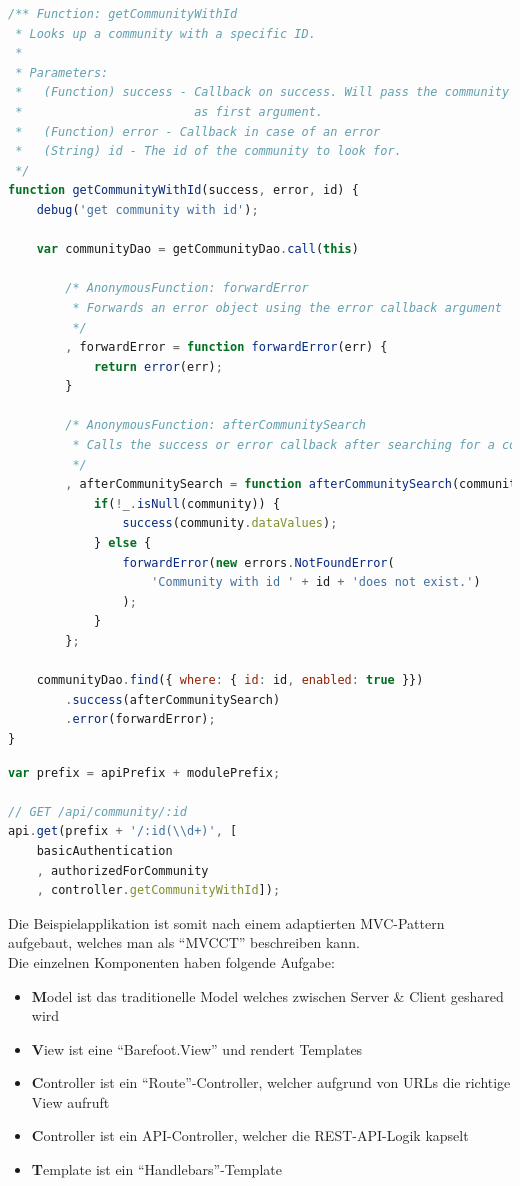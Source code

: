 \begin{lstlisting}[language=JavaScript, caption=API-Controller Beispiel, label=lst:roomiesControllerExample]
/** Function: getCommunityWithId
 * Looks up a community with a specific ID.
 *
 * Parameters:
 *   (Function) success - Callback on success. Will pass the community data
 *                        as first argument.
 *   (Function) error - Callback in case of an error
 *   (String) id - The id of the community to look for.
 */
function getCommunityWithId(success, error, id) {
	debug('get community with id');

	var communityDao = getCommunityDao.call(this)

		/* AnonymousFunction: forwardError
		 * Forwards an error object using the error callback argument
		 */
		, forwardError = function forwardError(err) {
			return error(err);
		}

		/* AnonymousFunction: afterCommunitySearch
		 * Calls the success or error callback after searching for a community.
		 */
		, afterCommunitySearch = function afterCommunitySearch(community) {
			if(!_.isNull(community)) {
				success(community.dataValues);
			} else {
				forwardError(new errors.NotFoundError(
					'Community with id ' + id + 'does not exist.')
				);
			}
		};

	communityDao.find({ where: { id: id, enabled: true }})
		.success(afterCommunitySearch)
		.error(forwardError);
}
\end{lstlisting}

\begin{lstlisting}[language=JavaScript, caption=API-Route Beispiel, label=lst:roomiesComponentExample]
var prefix = apiPrefix + modulePrefix;

// GET /api/community/:id
api.get(prefix + '/:id(\\d+)', [
	basicAuthentication
	, authorizedForCommunity
	, controller.getCommunityWithId]);
\end{lstlisting}

Die Beispielapplikation ist somit nach einem adaptierten MVC-Pattern aufgebaut, welches man als ``MVCCT'' beschreiben kann. \\
Die einzelnen Komponenten haben folgende Aufgabe:
\begin{itemize}
	\item{\textbf{M}odel ist das traditionelle Model welches zwischen Server \& Client geshared wird}
	\item{\textbf{V}iew ist eine ``Barefoot.View'' \cite{BarefootView} und rendert Templates}
	\item{\textbf{C}ontroller ist ein ``Route''-Controller, welcher aufgrund von URLs die richtige View aufruft}
	\item{\textbf{C}ontroller ist ein API-Controller, welcher die REST-API-Logik \cite{REST} kapselt}
	\item{\textbf{T}emplate ist ein ``Handlebars''-Template \cite{Handlebars}}
\end{itemize}
